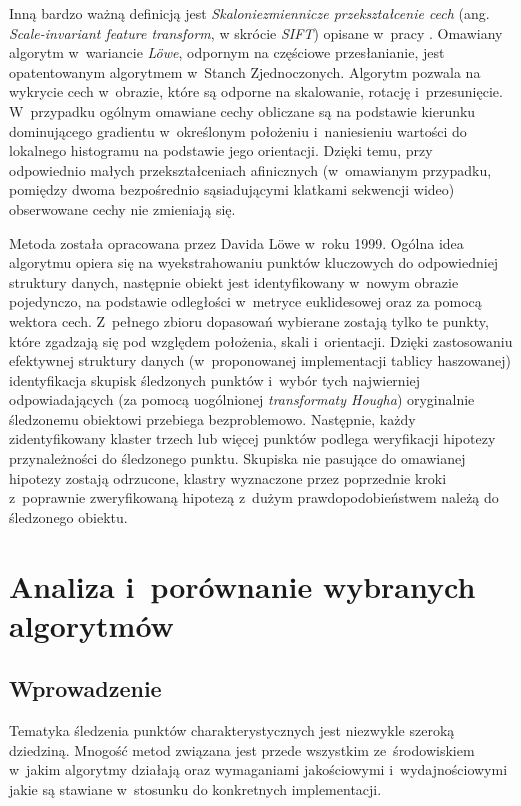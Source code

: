     Inną bardzo ważną definicją jest \textit{Skaloniezmiennicze przekształcenie cech} (ang. \textit{Scale-invariant feature transform}, w skrócie \textit{SIFT}) opisane w~pracy \cite{SalientPointsTracking05}. Omawiany algorytm w~wariancie \textit{L\"{o}we}, odpornym na częściowe przesłanianie, jest opatentowanym algorytmem w~Stanch Zjednoczonych. Algorytm pozwala na wykrycie cech w~obrazie, które są odporne na skalowanie, rotację i~przesunięcie. W~przypadku ogólnym omawiane cechy obliczane są na podstawie kierunku dominującego gradientu w~określonym położeniu i~naniesieniu wartości do lokalnego histogramu na podstawie jego orientacji. Dzięki temu, przy odpowiednio małych przekształceniach afinicznych (w~omawianym przypadku, pomiędzy dwoma bezpośrednio sąsiadującymi klatkami sekwencji wideo) obserwowane cechy nie zmieniają się.

    Metoda została opracowana przez Davida L\"{o}we w~roku 1999. Ogólna idea algorytmu opiera się na wyekstrahowaniu punktów kluczowych do odpowiedniej struktury danych, następnie obiekt jest identyfikowany w~nowym obrazie pojedynczo, na podstawie odległości w~metryce euklidesowej oraz za pomocą wektora cech. Z~pełnego zbioru dopasowań wybierane zostają tylko te punkty, które zgadzają się pod względem położenia, skali i~orientacji. Dzięki zastosowaniu efektywnej struktury danych (w~proponowanej implementacji tablicy haszowanej) identyfikacja skupisk śledzonych punktów i~wybór tych najwierniej odpowiadających (za pomocą uogólnionej \textit{transformaty Hougha}) oryginalnie śledzonemu obiektowi przebiega bezproblemowo. Następnie, każdy zidentyfikowany klaster trzech lub więcej punktów podlega weryfikacji hipotezy przynależności do śledzonego punktu. Skupiska nie pasujące do omawianej hipotezy zostają odrzucone, klastry wyznaczone przez poprzednie kroki z~poprawnie zweryfikowaną hipotezą z~dużym prawdopodobieństwem należą do śledzonego obiektu.

\chapter{Analiza i~porównanie wybranych algorytmów}\label{Chapter_Algorytmy}

  \section{Wprowadzenie}\label{Section_IntroductionToAlgorithms}

    Tematyka śledzenia punktów charakterystycznych jest niezwykle szeroką dziedziną. Mnogość metod związana jest przede wszystkim ze~środowiskiem w~jakim algorytmy działają oraz wymaganiami jakościowymi i~wydajnościowymi jakie są stawiane w~stosunku do konkretnych implementacji.

